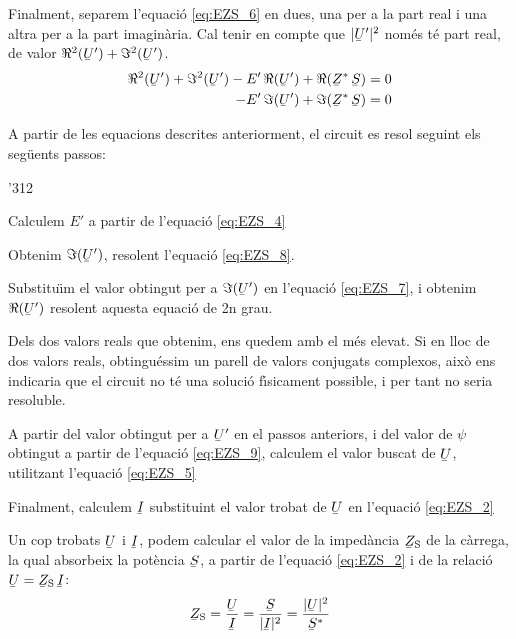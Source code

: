 Finalment, separem l'equaci\'{o} \eqref{eq:EZS_6} en dues, una per a la part real i una altra per a la part imagin\`{a}ria. Cal tenir en compte que $|\cmplx{U}'|^2$ nom\'{e}s t\'{e} part real, de valor $\Re^2(\cmplx{U}') + \Im^2(\cmplx{U}')$.
\begin{align}
   \Re^2(\cmplx{U}') + \Im^2(\cmplx{U}') - E' \, \Re(\cmplx{U}') + \Re(\cmplx{Z}^* \, \cmplx{S}) &= 0 \label{eq:EZS_7} \\
   - E' \, \Im(\cmplx{U}') + \Im(\cmplx{Z}^* \, \cmplx{S}) &= 0 \label{eq:EZS_8}
\end{align}

A partir de les equacions descrites anteriorment, el circuit es resol seguint els seg\"{u}ents passos:
\begin{dingautolist}{'312}
   \item Calculem $E'$ a partir de l'equaci\'{o} \eqref{eq:EZS_4}
   \item Obtenim $\Im(\cmplx{U}')$, resolent l'equaci\'{o} \eqref{eq:EZS_8}.
   \item Substitu\"{\i}m el valor obtingut per a $\Im(\cmplx{U}')$ en l'equaci\'{o} \eqref{eq:EZS_7}, i obtenim $\Re(\cmplx{U}')$ resolent aquesta equaci\'{o} de 2n grau.
   \item Dels dos valors reals que obtenim, ens quedem amb el m\'{e}s elevat. Si en lloc de dos valors reals, obtingu\'{e}ssim un parell de valors conjugats complexos, aix\`{o} ens indicaria que el circuit no t\'{e} una soluci\'{o} f\'{\i}sicament possible, i per tant no seria resoluble.
   \item A partir del valor  obtingut per a $\cmplx{U}'$ en el passos anteriors, i del valor de $\psi$ obtingut a partir de l'equaci\'{o} \eqref{eq:EZS_9}, calculem el valor buscat de $\cmplx{U}$, utilitzant l'equaci\'{o} \eqref{eq:EZS_5}
   \item Finalment, calculem $\cmplx{I}$ substituint el valor trobat de $\cmplx{U}$ en l'equaci\'{o} \eqref{eq:EZS_2}
\end{dingautolist}

Un cop trobats $\cmplx{U}$ i $\cmplx{I}$, podem calcular el valor de
la imped\`{a}ncia  $\cmplx{Z}\ped{S}$ de la c\`{a}rrega, la qual absorbeix
la pot\`{e}ncia $\cmplx{S}$, a partir de l'equaci\'{o} \eqref{eq:EZS_2} i de
la relaci\'{o} $\cmplx{U} = \cmplx{Z}\ped{S} \,\cmplx{I}$:
\begin{equation}
   \cmplx{Z}\ped{S} = \frac{\cmplx{U}}{\cmplx{I}} =
   \frac{\cmplx{S}}{|\cmplx{I}|^2} =
   \frac{|\cmplx{U}|^2}{\cmplx{S}^*} \label{eq:EZS 10}
\end{equation}


